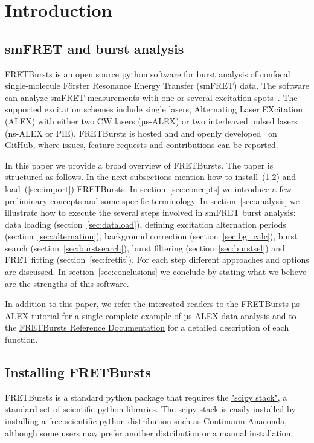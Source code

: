 \section{Introduction}

\subsection{smFRET and burst analysis}

FRETBursts is an open source python software for burst analysis of confocal 
single-molecule Förster Resonance Energy Transfer (smFRET) data. The software can analyze smFRET measurements
with one or several excitation spots~\cite{Ingargiola_2013}. The supported 
excitation schemes include single lasers, Alternating Laser EXcitation (ALEX) with either two CW lasers (µs-ALEX\cite{Kapanidis_2005}) 
or two interleaved pulsed lasers (ns-ALEX or PIE\cite{M_ller_2005}). 
FRETBursts is hosted and and openly developed~\cite{Prli__2012} on GitHub, where
issues, feature requests and contributions can be reported.

In this paper we provide a broad overview of FRETBursts. 
The paper is structured as follows. 
In the next subsections mention how to install~(\ref{sec:install}) and 
load~(\ref{sec:import}) FRETBursts.
In section~\ref{sec:concepts} we
introduce a few preliminary concepts and some specific terminology.
In section~\ref{sec:analysis} we illustrate how to execute the several steps involved
in smFRET burst analysis: data loading (section~\ref{sec:dataload}), defining 
excitation alternation periods (section~\ref{sec:alternation}), background 
correction (section~\ref{sec:bg_calc}), burst search (section~\ref{sec:burstsearch}), 
burst filtering (section~\ref{sec:burstsel}) and FRET fitting (section~\ref{sec:fretfit}). 
For each step different approaches and options are discussed. 
In section~\ref{sec:conclusions} we conclude by stating what we believe are
the strengths of this software.

In addition to this paper, we refer the interested readers to the 
\href{http://nbviewer.ipython.org/github/tritemio/FRETBursts_notebooks/blob/master/notebooks/FRETBursts\%20-\%20us-ALEX\%20smFRET\%20burst\%20analysis.ipynb}{FRETBursts µs-ALEX tutorial} 
for a single complete example of µs-ALEX data analysis and to the
\href{http://fretbursts.readthedocs.org/}{FRETBursts Reference Documentation}
for a detailed description of each function.

\subsection{Installing FRETBursts}
\label{sec:install}
FRETBursts is a standard python package that requires the 
\href{http://www.scipy.org/stackspec.html}{"scipy stack"}, a 
standard set of scientific python libraries.
The scipy stack is easily installed by installing a free scientific python
distribution such as \href{https://store.continuum.io/cshop/anaconda/}{Continuum Anaconda}, 
although some users may prefer another distribution or a manual installation.

